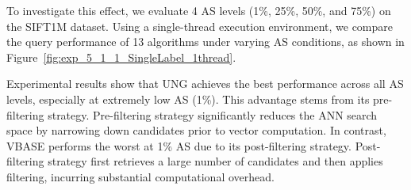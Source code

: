 \documentclass[sigconf, nonacm]{acmart}
\begin{document}
To investigate this effect, we evaluate 4 AS levels (1\%, 25\%, 50\%, and 75\%) on the SIFT1M dataset. Using a single-thread execution environment, we compare the query performance of 13 algorithms under varying AS conditions, as shown in Figure~\ref{fig:exp_5_1_1_SingleLabel_1thread}.

Experimental results show that UNG achieves the best performance across all AS levels, especially at extremely low AS (1\%). 
This advantage stems from its pre-filtering strategy. Pre-filtering strategy significantly reduces the ANN search space by narrowing down candidates prior to vector computation. In contrast, VBASE performs the worst at 1\% AS due to its post-filtering strategy. Post-filtering strategy first retrieves a large number of candidates and then applies filtering, incurring substantial computational overhead.
\end{document}
